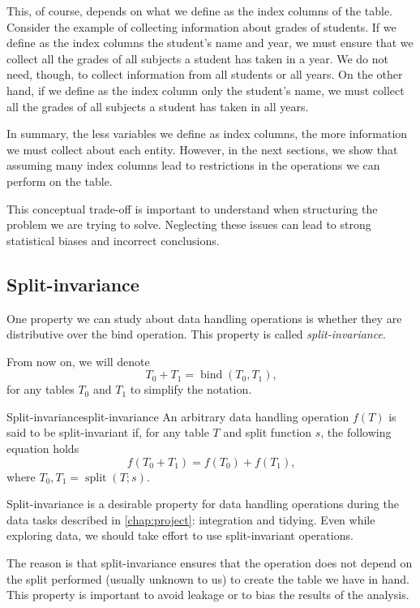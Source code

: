 This, of course, depends on what we define as the index columns of the table.  Consider
the example of collecting information about grades of students.  If we define as the index
columns the student's name and year, we must ensure that we collect all the grades of all
subjects a student has taken in a year.  We do not need, though, to collect information
from all students or all years.  On the other hand, if we define as the index column only
the student's name, we must collect all the grades of all subjects a student has taken in
all years.

In summary, the less variables we define as index columns, the more information we must
collect about each entity.  However, in the next sections, we show that assuming many index columns
lead to restrictions in the operations we can perform on the table.

This conceptual trade-off is important to understand when structuring the problem we are
trying to solve.  Neglecting these issues can lead to strong statistical biases and
incorrect conclusions.

\subsection{Split-invariance}

One property we can study about data handling operations is whether they are distributive
over the bind operation.  This property is called \emph{split-invariance}.

From now on, we will denote \[
  T_0 + T_1 = \operatorname{bind}(T_0, T_1)\text{,}
\] for any tables $T_0$ and $T_1$ to simplify the notation.

\begin{defbox}{Split-invariance}{split-invariance}
An arbitrary data handling operation $f(T)$ is said to be split-invariant
if, for any table $T$ and split function $s$, the following equation holds \[
  f\!\left(T_0 + T_1\right) =
    f\!\left(T_0\right) + f\!\left(T_1\right)\text{,}
\] where $T_0, T_1 = \operatorname{split}\!\left(T; s\right)$.
\end{defbox}

Split-invariance is a desirable property for data handling operations during the data
tasks described in \cref{chap:project}: integration and tidying.  Even while exploring
data, we should take effort to use split-invariant operations.

The reason is that split-invariance ensures that the operation does not depend on the
split performed (usually unknown to us) to create the table we have in hand.  This
property is important to avoid \gls{leakage} or to bias the results of the analysis.

